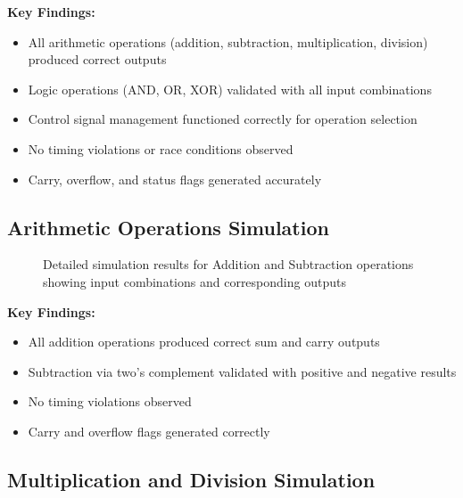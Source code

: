 \textbf{Key Findings:}
\begin{itemize}
    \item All arithmetic operations (addition, subtraction, multiplication, division) produced correct outputs
    \item Logic operations (AND, OR, XOR) validated with all input combinations
    \item Control signal management functioned correctly for operation selection
    \item No timing violations or race conditions observed
    \item Carry, overflow, and status flags generated accurately
\end{itemize}

\subsection{Arithmetic Operations Simulation}

\begin{figure}[h]
    \centering
    \caption{Detailed simulation results for Addition and Subtraction operations showing input combinations and corresponding outputs}
    \label{fig:sim-arithmetic}
\end{figure}

\textbf{Key Findings:}
\begin{itemize}
    \item All addition operations produced correct sum and carry outputs
    \item Subtraction via two's complement validated with positive and negative results
    \item No timing violations observed
    \item Carry and overflow flags generated correctly
\end{itemize}

\subsection{Multiplication and Division Simulation}


